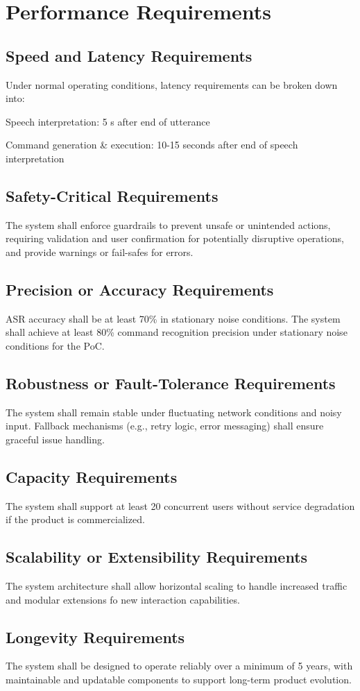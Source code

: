 \documentclass[12pt]{article}
\begin{document}
\section{Performance Requirements}
\subsection{Speed and Latency Requirements}
Under normal operating conditions, latency requirements can be broken down into:

Speech interpretation: 5 s after end of utterance

Command generation \& execution: 10-15 seconds after end of speech interpretation
\subsection{Safety-Critical Requirements}
The system shall enforce guardrails to prevent unsafe or unintended actions, requiring validation and user confirmation for potentially disruptive operations, and provide warnings or fail-safes for errors.
\subsection{Precision or Accuracy Requirements}
ASR accuracy shall be at least 70\% in stationary noise conditions. The system shall achieve at least 80\% command recognition precision under stationary noise conditions for the PoC.
\subsection{Robustness or Fault-Tolerance Requirements}
The system shall remain stable under fluctuating network conditions and noisy input. Fallback mechanisms (e.g., retry logic, error messaging) shall ensure graceful issue handling.
\subsection{Capacity Requirements}
The system shall support at least 20 concurrent users without service degradation if the product is commercialized.
\subsection{Scalability or Extensibility Requirements}
The system architecture shall allow horizontal scaling to handle increased traffic and modular extensions fo new interaction capabilities. 
\subsection{Longevity Requirements}
The system shall be designed to operate reliably over a minimum of 5 years, with maintainable and updatable components to support long-term product evolution.
\end{document}
